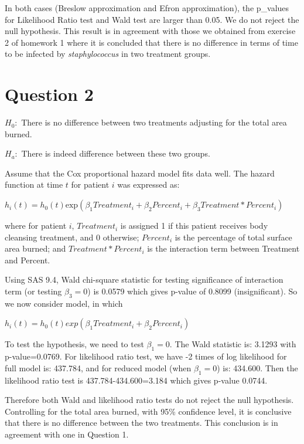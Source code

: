 \documentclass[a4paper, 12pt]{article}
\begin{document}
In both cases (Breslow approximation and Efron approximation), the p\_values for Likelihood Ratio test and Wald test are larger than 0.05. We do not reject the null hypothesis.
This result is in agreement with those we obtained from exercise 2 of homework 1 where it is concluded that there is no difference in terms of time to be infected by \textit{staphylococcus} in two treatment groups. 




\section*{Question 2}

$H_0:$ There is no difference between two treatments adjusting for the total area burned.

$H_a:$ There is indeed difference between these two groups.

Assume that the Cox proportional hazard model fits data well. The hazard function at time $t$ for patient $i$ was expressed as:
\begin{center}
$h_i(t) = h_0(t)\mbox{exp}(\beta_1 Treatment_i+\beta_2 Percent_i+\beta_3 Treatment*Percent_i)$
\end{center}
where for patient $i$, $Treatment_i$ is assigned 1 if this patient receives body cleansing treatment, and 0 otherwise; $Percent_i$ is the percentage of total surface area burned; and $Treatment*Percent_i$ is the interaction term between Treatment and Percent.

Using SAS 9.4, Wald chi-square statistic for testing significance of interaction term (or testing $\beta_3=0$) is 0.0579 which gives p-value of 0.8099 (insignificant). So we now consider model, in which
\begin{center}
$h_i(t) = h_0(t)exp(\beta_1 Treatment_i+\beta_2 Percent_i)$
\end{center}
To test the hypothesis, we need to test $\beta_1=0$. The Wald statistic is: 3.1293 with p-value=0.0769. For likelihood ratio test, we have -2 times of log likelihood for full model is: 437.784, and for reduced model (when $\beta_1=0$) is: 434.600. Then the likelihood ratio test is 437.784-434.600=3.184 which gives p-value 0.0744.




Therefore both Wald and likelihood ratio tests do not reject the null hypothesis. Controlling for the total area burned, with 95\% confidence level, it is conclusive that there is no difference between the two treatments. This conclusion is in agreement with one in Question 1.
\end{document}
